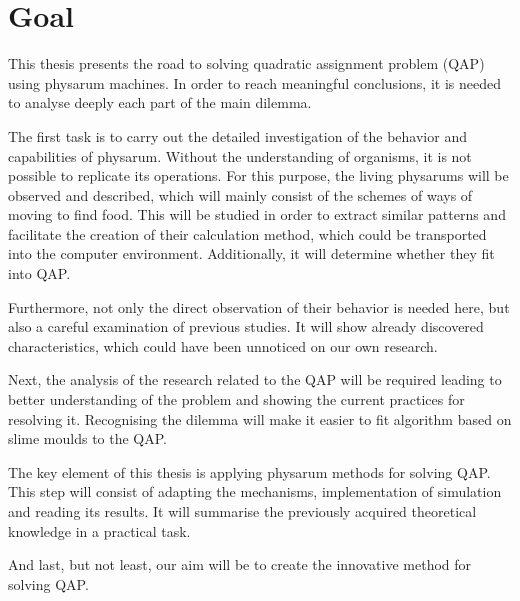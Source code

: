 \section{Goal}
\label{section:introduction_goal}

This thesis presents the road to solving quadratic assignment problem (QAP) using physarum machines. In order to reach meaningful conclusions, it is needed to analyse deeply each part of the main dilemma.

The first task is to carry out the detailed investigation of the behavior and capabilities of physarum. Without the understanding of organisms, it is not possible to replicate its operations. For this purpose, the living physarums will be observed and described, which will mainly consist of the schemes of ways of moving to find food. This will be studied in order to extract similar patterns and facilitate the creation of their calculation method, which could be transported into the computer environment. Additionally, it will determine whether they fit into QAP.

Furthermore, not only the direct observation of their behavior is needed here, but also a careful examination of previous studies. It will show already discovered characteristics, which could have been unnoticed on our own research.

Next, the analysis of the research related to the QAP will be required leading to better understanding of the problem and showing the current practices for resolving it. Recognising the dilemma will make it easier to fit algorithm based on slime moulds to the QAP.

The key element of this thesis is applying physarum methods for solving QAP. This step will consist of adapting the mechanisms, implementation of simulation and reading its results. It will summarise the previously acquired theoretical knowledge in a practical task.

And last, but not least, our aim will be to create the innovative method for solving QAP.
